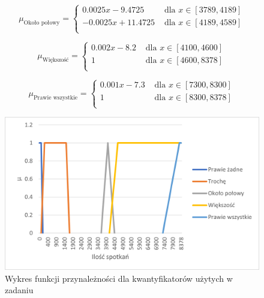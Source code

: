 \documentclass{classrep}
\begin{document}
   \begin{equation}
    \mu_{\text{Około połowy}} =
      \begin{cases}
        0.0025x - 9.4725 & \text{ dla } x \in [3789,4189] \\
        -0.0025x + 11.4725 & \text{ dla } x \in [4189,4589] \\
      \end{cases}  
  \end{equation}
  
  \begin{equation}
    \mu_{\text{Większość}} =
      \begin{cases}
        0.002x - 8.2 & \text{ dla } x \in [4100,4600] \\
        1 & \text{ dla } x \in [4600,8378] \\
      \end{cases}  
  \end{equation}
  
  \begin{equation}
    \mu_{\text{Prawie wszystkie}} =
      \begin{cases}
        0.001x - 7.3 & \text{ dla } x \in [7300,8300] \\
        1 & \text{ dla } x \in [8300,8378] \\
      \end{cases}  
  \end{equation}
  
 \begin{figure}[H]
 \centering
   \includegraphics{kwantyfikatory.png}
   \caption{Wykres funkcji przynależności dla kwantyfikatorów użytych w zadaniu}
 \end{figure}

\end{document}
